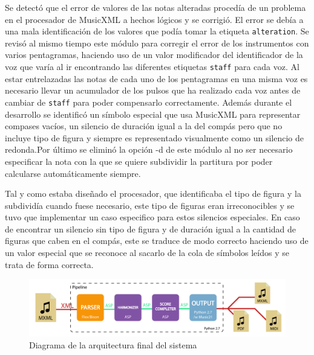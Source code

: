 Se detectó que el error de valores de las notas alteradas procedía de un problema en el procesador de MusicXML a hechos lógicos y se corrigió. El error se debía a una mala identificación de los valores que podía tomar la etiqueta \texttt{alteration}. Se revisó al mismo tiempo este módulo para corregir el error de los instrumentos con varios pentagramas, haciendo uso de un valor modificador del identificador de la voz que varía al ir encontrando las diferentes etiquetas \texttt{staff} para cada voz. Al estar entrelazadas las notas de cada uno de los pentagramas en una misma voz es necesario llevar un acumulador de los pulsos que ha realizado cada voz antes de cambiar de \texttt{staff} para poder compensarlo correctamente. Además durante el desarrollo se identificó un símbolo especial que usa MusicXML para representar compases vacíos, un silencio de duración igual a la del compás pero que no incluye tipo de figura y siempre es representado visualmente como un silencio de redonda.Por último se eliminó la opción -d de este módulo al no ser necesario especificar la nota con la que se quiere subdividir la partitura por poder calcularse automáticamente siempre.

Tal y como estaba diseñado el procesador, que identificaba el tipo de figura y la subdividía cuando fuese necesario, este tipo de figuras eran irreconocibles y se tuvo que implementar un caso especifico para estos silencios especiales. En caso de encontrar un silencio sin tipo de figura y de duración igual a la cantidad de figuras que caben en el compás, este se traduce de modo correcto haciendo uso de un valor especial que se reconoce al sacarlo de la cola de símbolos leídos y se trata de forma correcta.

\begin{figure}
	\centering
	\includegraphics[width=0.8\linewidth]{imagenes/arquitectura_final.pdf}
	\caption{Diagrama de la arquitectura final del sistema}
	\label{fig:arquitectura_final}
\end{figure}


